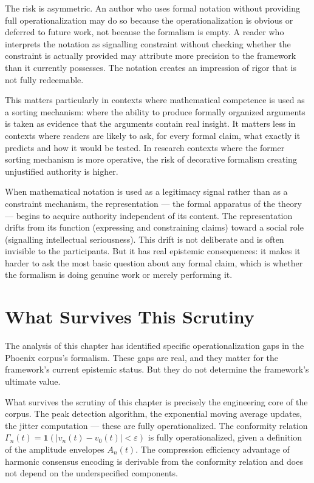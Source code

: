 The risk is asymmetric. An author who uses formal notation
without providing full operationalization may do so
because the operationalization is obvious or deferred to
future work, not because the formalism is empty. A reader
who interprets the notation as signalling constraint
without checking whether the constraint is actually
provided may attribute more precision to the framework
than it currently possesses. The notation creates an
impression of rigor that is not fully redeemable.

This matters particularly in contexts where mathematical
competence is used as a sorting mechanism: where the
ability to produce formally organized arguments is taken
as evidence that the arguments contain real insight.
It matters less in contexts where readers are likely to
ask, for every formal claim, what exactly it predicts
and how it would be tested. In research contexts where
the former sorting mechanism is more operative, the risk
of decorative formalism creating unjustified authority
is higher.

\begin{dangerzone}
When mathematical notation is used as a legitimacy signal
rather than as a constraint mechanism, the representation
--- the formal apparatus of the theory --- begins to
acquire authority independent of its content. The
representation drifts from its function (expressing and
constraining claims) toward a social role (signalling
intellectual seriousness). This drift is not deliberate
and is often invisible to the participants. But it has
real epistemic consequences: it makes it harder to ask
the most basic question about any formal claim, which
is whether the formalism is doing genuine work or merely
performing it.
\end{dangerzone}

\section{What Survives This Scrutiny}
\label{sec:survives-scrutiny}

The analysis of this chapter has identified specific
operationalization gaps in the Phoenix corpus's formalism.
These gaps are real, and they matter for the framework's
current epistemic status. But they do not determine the
framework's ultimate value.

What survives the scrutiny of this chapter is precisely
the engineering core of the corpus. The peak detection
algorithm, the exponential moving average updates, the
jitter computation --- these are fully operationalized.
The conformity relation $\Gamma_n(t) = \mathbf{1}(|v_n(t)
- v_0(t)| < \varepsilon)$ is fully operationalized, given
a definition of the amplitude envelopes $A_n(t)$. The
compression efficiency advantage of harmonic consensus
encoding is derivable from the conformity relation and
does not depend on the underspecified components.


